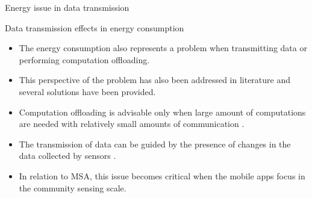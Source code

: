 \begin{frame}{Energy issue in data transmission}
  \begin{block}{Data transmission effects in energy consumption}
    \begin{itemize}
      \item The energy consumption also represents a problem when transmitting data or performing computation offloading.
      \item This perspective of the problem has also been addressed in literature and several solutions have been provided.
      \item Computation offloading is advisable only when large amount of computations are needed with relatively small amounts of communication \citep{Kumar2010}.
      \item The transmission of data can be guided by the presence of changes in the data collected by sensors \citep{Musolesi2010}.
      \item In relation to MSA, this issue becomes critical when the mobile apps focus in the community sensing scale.
    \end{itemize}
  \end{block}
\end{frame}


